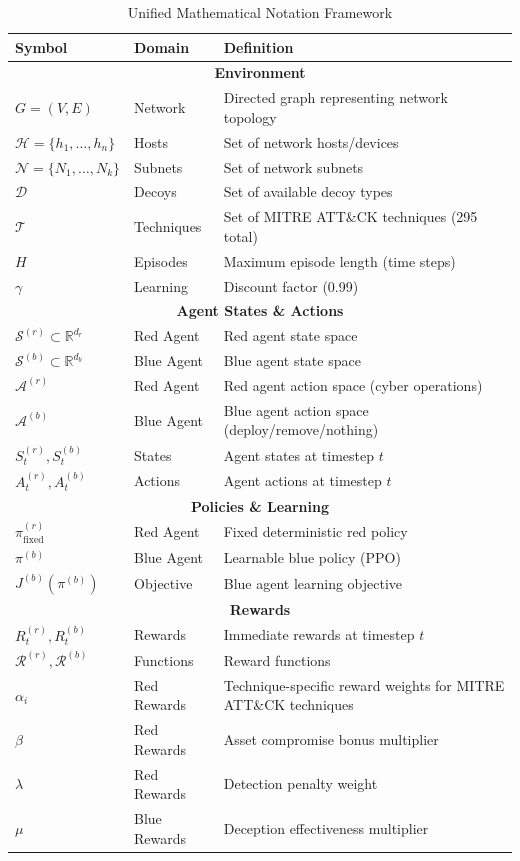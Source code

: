 \documentclass[12pt,oneside]{article}
\begin{document}
\begin{table}[h]
\centering
\caption{Unified Mathematical Notation Framework}
\label{tab:unified_notation}
\small
\begin{tabular}{|l|l|p{6cm}|}
\hline
\textbf{Symbol} & \textbf{Domain} & \textbf{Definition} \\
\hline
\multicolumn{3}{|c|}{\textbf{Environment}} \\
\hline
$G = (V, E)$ & Network & Directed graph representing network topology \\
$\mathcal{H} = \{h_1, \ldots, h_n\}$ & Hosts & Set of network hosts/devices \\
$\mathcal{N} = \{N_1, \ldots, N_k\}$ & Subnets & Set of network subnets \\
$\mathcal{D}$ & Decoys & Set of available decoy types \\
$\mathcal{T}$ & Techniques & Set of MITRE ATT\&CK techniques (295 total) \\
$H$ & Episodes & Maximum episode length (time steps) \\
$\gamma$ & Learning & Discount factor (0.99) \\
\hline
\multicolumn{3}{|c|}{\textbf{Agent States \& Actions}} \\
\hline
$\mathcal{S}^{(r)} \subset \mathbb{R}^{d_r}$ & Red Agent & Red agent state space \\
$\mathcal{S}^{(b)} \subset \mathbb{R}^{d_b}$ & Blue Agent & Blue agent state space \\
$\mathcal{A}^{(r)}$ & Red Agent & Red agent action space (cyber operations) \\
$\mathcal{A}^{(b)}$ & Blue Agent & Blue agent action space (deploy/remove/nothing) \\
$S_t^{(r)}, S_t^{(b)}$ & States & Agent states at timestep $t$ \\
$A_t^{(r)}, A_t^{(b)}$ & Actions & Agent actions at timestep $t$ \\
\hline
\multicolumn{3}{|c|}{\textbf{Policies \& Learning}} \\
\hline
$\pi^{(r)}_{\text{fixed}}$ & Red Agent & Fixed deterministic red policy \\
$\pi^{(b)}$ & Blue Agent & Learnable blue policy (PPO) \\
$J^{(b)}(\pi^{(b)})$ & Objective & Blue agent learning objective \\
\hline
\multicolumn{3}{|c|}{\textbf{Rewards}} \\
\hline
$R_t^{(r)}, R_t^{(b)}$ & Rewards & Immediate rewards at timestep $t$ \\
$\mathcal{R}^{(r)}, \mathcal{R}^{(b)}$ & Functions & Reward functions \\
$\alpha_i$ & Red Rewards & Technique-specific reward weights for MITRE ATT\&CK techniques \\
$\beta$ & Red Rewards & Asset compromise bonus multiplier \\
$\lambda$ & Red Rewards & Detection penalty weight \\
$\mu$ & Blue Rewards & Deception effectiveness multiplier \\
\hline
\end{tabular}
\end{table}
\end{document}
